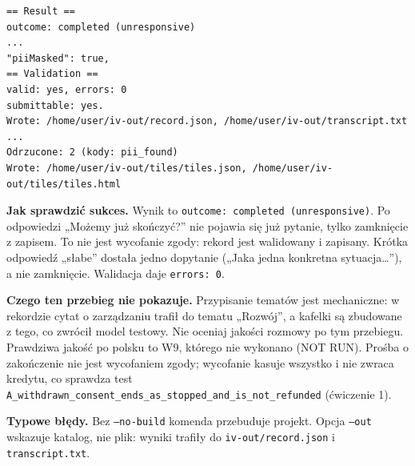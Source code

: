 {\begin{Verbatim}[fontsize=\scriptsize,frame=single,framesep=2mm]
== Result ==
outcome: completed (unresponsive)
...
"piiMasked": true,
== Validation ==
valid: yes, errors: 0
submittable: yes.
Wrote: /home/user/iv-out/record.json, /home/user/iv-out/transcript.txt
...
Odrzucone: 2 (kody: pii_found)
Wrote: /home/user/iv-out/tiles/tiles.json, /home/user/iv-out/tiles/tiles.html
\end{Verbatim}

\textbf{Jak sprawdzić sukces.} Wynik to \texttt{outcome: completed (unresponsive)}.
Po odpowiedzi „Możemy już skończyć?” nie pojawia się już pytanie, tylko zamknięcie
z zapisem. To nie jest wycofanie zgody: rekord jest walidowany i zapisany. Krótka
odpowiedź „słabe” dostała jedno dopytanie („Jaka jedna konkretna sytuacja…”),
a nie zamknięcie. Walidacja daje \texttt{errors: 0}.

\textbf{Czego ten przebieg nie pokazuje.} Przypisanie tematów jest mechaniczne:
w rekordzie cytat o zarządzaniu trafił do tematu „Rozwój”, a kafelki są
zbudowane z tego, co zwrócił model testowy. Nie oceniaj jakości rozmowy po tym przebiegu.
Prawdziwa jakość po polsku to W9, którego nie wykonano (NOT RUN). Prośba o zakończenie
nie jest wycofaniem zgody; wycofanie kasuje wszystko i nie zwraca kredytu, co
sprawdza test \texttt{A\_\allowbreak{}withdrawn\_\allowbreak{}consent\_\allowbreak{}ends\_\allowbreak{}as\_\allowbreak{}stopped\_\allowbreak{}and\_\allowbreak{}is\_\allowbreak{}not\_\allowbreak{}refunded}
(ćwiczenie 1).

\textbf{Typowe błędy.} Bez \texttt{--no-build} komenda przebuduje projekt. Opcja
\texttt{--out} wskazuje katalog, nie plik: wyniki trafiły do \texttt{iv-out/record.json}
i \texttt{transcript.txt}.


}
